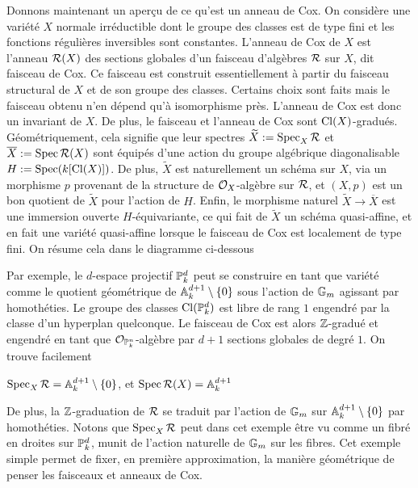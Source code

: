 Donnons maintenant un aperçu de ce qu'est un anneau de Cox. On considère une variété $X$ normale irréductible dont le groupe des classes est de type fini et les fonctions régulières inversibles sont constantes. L'anneau de Cox de $X$ est l'anneau $\mathcal{R}(X)$ des sections globales d'un faisceau d'algèbres $\mathcal{R}$ sur $X$, dit faisceau de Cox. Ce faisceau est construit essentiellement à partir du faisceau structural de $X$ et de son groupe des classes. Certains choix sont faits mais le faisceau obtenu n'en dépend qu'à isomorphisme près. L'anneau de Cox est donc un invariant de $X$. De plus, le faisceau et l'anneau de Cox sont $\operatorname{Cl}(X)$-gradués. Géométriquement, cela signifie que leur spectres $\widetilde{X}:=\operatorname{Spec}_X \mathcal{R}$ et $\overline{X}:=\operatorname{Spec} \mathcal{R}(X)$ sont équipés d'une action du groupe algébrique diagonalisable $H:=\operatorname{Spec}(k[\operatorname{Cl}(X)])$. De plus, $\widetilde{X}$ est naturellement un schéma sur $X$, via un morphisme $p$ provenant de la structure de $\mathcal{O}_X$-algèbre sur $\mathcal{R}$, et $(X, p)$ est un bon quotient de $\widetilde{X}$ pour l'action de $H$. Enfin, le morphisme naturel $\widetilde{X}\rightarrow \overline{X}$ est une immersion ouverte $H$-équivariante, ce qui fait de $\widetilde{X}$ un schéma quasi-affine, et en fait une variété quasi-affine lorsque le faisceau de Cox est localement de type fini. On résume cela dans le diagramme ci-dessous
	\begin{center}
	\end{center}

Par exemple, le $d$-espace projectif $\mathbb{P}_k^d$ peut se construire en tant que variété comme le quotient géométrique de $\mathbb{A}^{d+1}_k\setminus \lbrace 0 \rbrace$ sous l'action de $\mathbb{G}_m$ agissant par homothéties. Le groupe des classes $\operatorname{Cl}(\mathbb{P}_k^d)$ est libre de rang $1$ engendré par la classe d'un hyperplan quelconque. Le faisceau de Cox est alors $\mathbb{Z}$-gradué et engendré en tant que $\mathcal{O}_{\mathbb{P}_k^n}$-algèbre par $d+1$ sections globales de degré $1$. On trouve facilement
\begin{center}
$\operatorname{Spec}_X\mathcal{R}=\mathbb{A}^{d+1}_k\setminus \lbrace 0 \rbrace$, et $\operatorname{Spec} \mathcal{R}(X)=\mathbb{A}^{d+1}_k$
\end{center}
De plus, la $\mathbb{Z}$-graduation de $\mathcal{R}$ se traduit par l'action de $\mathbb{G}_m$ sur $\mathbb{A}^{d+1}_k\setminus \lbrace 0 \rbrace$ par homothéties. Notons que $\operatorname{Spec}_X\mathcal{R}$ peut dans cet exemple être vu comme un fibré en droites sur $\mathbb{P}_k^d$, munit de l'action naturelle de $\mathbb{G}_m$ sur les fibres. Cet exemple simple permet de fixer, en première approximation, la manière géométrique de penser les faisceaux et anneaux de Cox.


